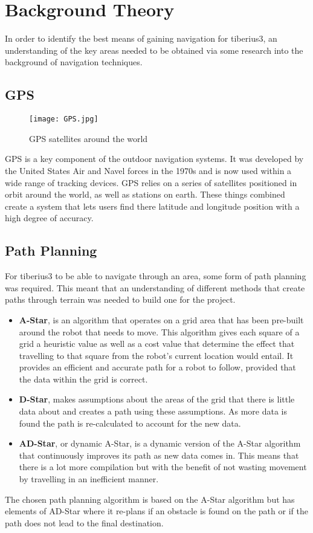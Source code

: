 \section{Background Theory}
In order to identify the best means of gaining navigation for \gls{tiberius3}, an understanding of the key areas needed to be obtained via some research into the background of navigation techniques.
\subsection{GPS}

\begin{figure}[!htb]
\begin{center}
\texttt{[image: GPS.jpg]}
\end{center}
\caption{\gls{GPS} satellites around the world\cite{RobotNavigation}}
\label{fig:AGNavigation}
\end{figure}
\noindent
\gls{GPS} is a key component of the outdoor navigation systems. It was developed by the United States Air and Navel forces in the 1970s and is now used within a wide range of tracking devices. \gls{GPS} relies on a series of satellites positioned in orbit around the world, as well as stations on earth. These things combined create a system that lets users find there latitude and longitude position with a high degree of accuracy.
\subsection{Path Planning}
For \gls{tiberius3} to be able to navigate through an area, some form of path planning was required. This meant that an understanding of different methods that create paths through terrain was needed to build one for the project.

\begin{itemize}
\item \textbf{A-Star}, is an algorithm that operates on a grid area that has been pre-built around the robot that needs to move. This algorithm gives each square of a grid a heuristic value as well as a cost value that determine the effect that travelling to that square from the robot's current location would entail. It provides an efficient and accurate path for a robot to follow, provided that the data within the grid is correct.
\item \textbf{D-Star}, makes assumptions about the areas of the grid that there is little data about and creates a path using these assumptions. As more data is found the path is re-calculated to account for the new data.
\item \textbf{AD-Star}, or dynamic A-Star, is a dynamic version of the A-Star algorithm that continuously improves its path as new data comes in. This means that there is a lot more compilation but with the benefit of not wasting movement by travelling in an inefficient manner.
\end{itemize}
The chosen path planning algorithm is based on the A-Star algorithm but has elements of AD-Star where it re-plans if an obstacle is found on the path or if the path does not lead to the final destination.

